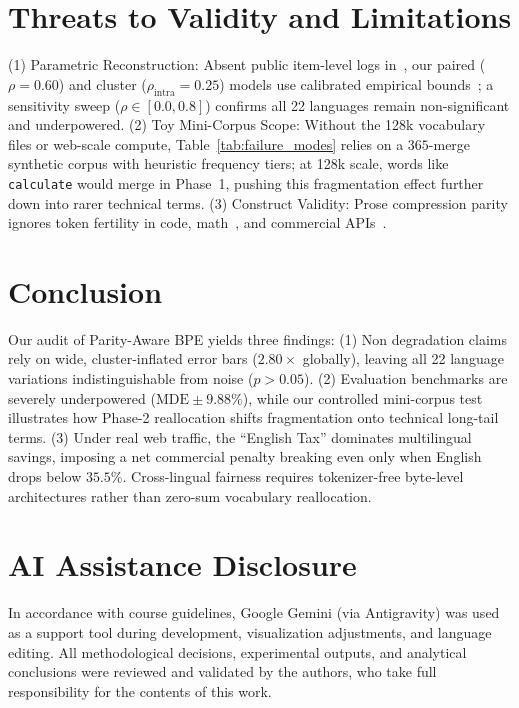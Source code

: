 \documentclass[sigconf,nonacm]{acmart}
\begin{document}
\section{Threats to Validity and Limitations}
\label{sec:limitations}

{(1) Parametric Reconstruction:} Absent public item-level logs in~\cite{foroutan2026parity}, our paired ($\rho=0.60$) and cluster ($\rho_{\mathrm{intra}}=0.25$) models use calibrated empirical bounds~\cite{miller2024adding,abadie2022when}; a sensitivity sweep ($\rho \in [0.0, 0.8]$) confirms all 22 languages remain non-significant and underpowered.
{(2) Toy Mini-Corpus Scope:} Without the 128k vocabulary files or web-scale compute, Table~\ref{tab:failure_modes} relies on a $365$-merge synthetic corpus with heuristic frequency tiers; at 128k scale, words like \texttt{calculate} would merge in Phase~1, pushing this fragmentation effect further down into rarer technical terms.
{(3) Construct Validity:} Prose compression parity ignores token fertility in code, math~\cite{singh2024tokenization}, and commercial APIs~\cite{ahia2023all}.

\section{Conclusion}
\label{sec:conclusion}

Our audit of Parity-Aware BPE yields three findings:
(1) Non degradation claims rely on wide, cluster-inflated error bars ($2.80\times$ globally), leaving all 22 language variations indistinguishable from noise ($p > 0.05$).
(2) Evaluation benchmarks are severely underpowered ($\mathrm{MDE} \pm 9.88\%$), while our controlled mini-corpus test illustrates how Phase-2 reallocation shifts fragmentation onto technical long-tail terms.
(3) Under real web traffic, the ``English Tax'' dominates multilingual savings, imposing a net commercial penalty breaking even only when English drops below $35.5\%$.
Cross-lingual fairness requires tokenizer-free byte-level architectures rather than zero-sum vocabulary reallocation.



\section*{AI Assistance Disclosure}
In accordance with course guidelines, Google Gemini (via Antigravity) was used as a support tool during development, visualization adjustments, and language editing. All methodological decisions, experimental outputs, and analytical conclusions were reviewed and validated by the authors, who take full responsibility for the contents of this work.
\end{document}
